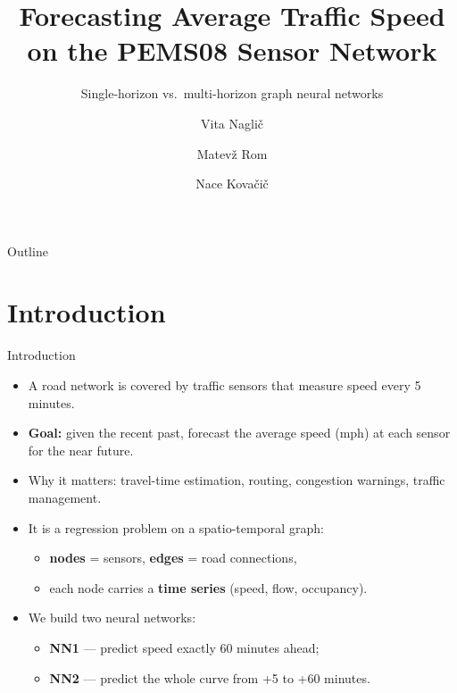 \documentclass[aspectratio=169]{beamer}
\title[Traffic Speed Forecasting on PEMS08]{Forecasting Average Traffic Speed\\on the PEMS08 Sensor Network}
\subtitle{Single-horizon vs.\ multi-horizon graph neural networks}
\author{Vita Nagli\v{c} \and Matev\v{z} Rom \and Nace Kova\v{c}i\v{c}}
\institute{Artificial Intelligence}
\date{}
\begin{document}
\begin{frame}
  \titlepage
\end{frame}

\begin{frame}{Outline}
  \tableofcontents
\end{frame}

\section{Introduction}
\begin{frame}{Introduction}
  \begin{itemize}
    \item A road network is covered by traffic sensors that measure speed every 5 minutes.
    \item \textbf{Goal:} given the recent past, forecast the average speed (mph) at each sensor for the near future.
    \item Why it matters: travel-time estimation, routing, congestion warnings, traffic management.
    \item It is a regression problem on a spatio-temporal graph:
    \begin{itemize}
      \item \textbf{nodes} = sensors, \textbf{edges} = road connections,
      \item each node carries a \textbf{time series} (speed, flow, occupancy).
    \end{itemize}
    \item We build two neural networks:
    \begin{itemize}
      \item \textbf{NN1} --- predict speed exactly 60 minutes ahead;
      \item \textbf{NN2} --- predict the whole curve from +5 to +60 minutes.
    \end{itemize}
  \end{itemize}
\end{frame}

\end{document}
